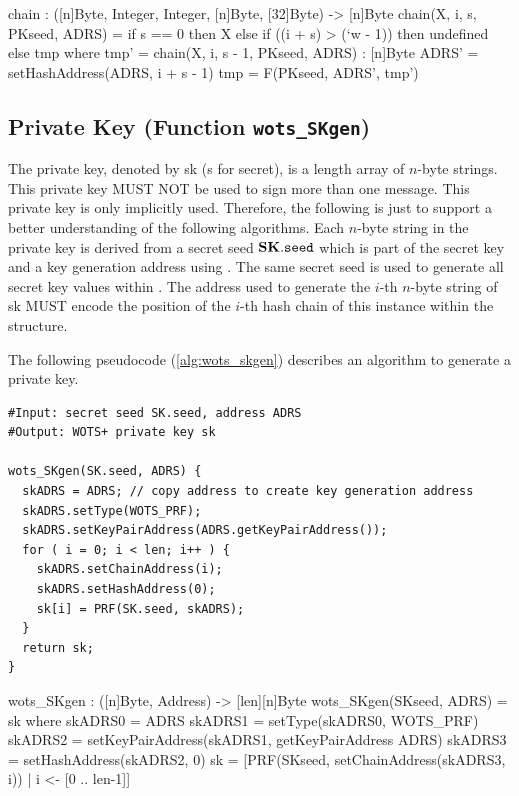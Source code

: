 \begin{code}
  chain : ([n]Byte, Integer, Integer, [n]Byte, [32]Byte) -> [n]Byte
  chain(X, i, s, PKseed, ADRS) =
    if s == 0 then
      X
    else if ((i + s) > (`w - 1)) then
      undefined
    else
      tmp
      where
        tmp' = chain(X, i, s - 1, PKseed, ADRS) : [n]Byte
        ADRS' = setHashAddress(ADRS, i + s - 1)
        tmp = F(PKseed, ADRS', tmp')
\end{code}

\subsection{\wotsp Private Key (Function \texttt{wots\_SKgen})}
The \wotsp private key, denoted by sk (s for secret), is a length \len array of
$n$-byte strings. This private key MUST NOT be used to sign more than one
message. This private key is only implicitly used. Therefore, the following is
just to support a better understanding of the following algorithms.
Each $n$-byte string in the \wotsp private key is derived from a secret
seed $\mathbf{SK}.\texttt{seed}$ which is part of the \spx secret key and
a \wotsp key generation address \skadrs using \sphincsPRF. The same secret seed is used to generate
all secret key values within \spx.
The address used to generate the $i$-th $n$-byte string of sk
MUST encode the position of the $i$-th hash chain of this \wotsp instance
within the \spx structure.

The following pseudocode (\autoref{alg:wots_skgen}) describes an algorithm
to generate a \wotsp private key.

\begin{lstlisting}[label=alg:wots_skgen, language=pseudoc,
                   caption=\texttt{wots\_SKgen} -- Generating a \wotsp private key.]
#Input: secret seed SK.seed, address ADRS
#Output: WOTS+ private key sk

wots_SKgen(SK.seed, ADRS) {
  skADRS = ADRS; // copy address to create key generation address
  skADRS.setType(WOTS_PRF);
  skADRS.setKeyPairAddress(ADRS.getKeyPairAddress());
  for ( i = 0; i < len; i++ ) {
    skADRS.setChainAddress(i);
    skADRS.setHashAddress(0);
    sk[i] = PRF(SK.seed, skADRS);
  }
  return sk;
}
\end{lstlisting}

\begin{code}
  wots_SKgen : ([n]Byte, Address) -> [len][n]Byte
  wots_SKgen(SKseed, ADRS) = sk where
    skADRS0 = ADRS
    skADRS1 = setType(skADRS0, WOTS_PRF)
    skADRS2 = setKeyPairAddress(skADRS1, getKeyPairAddress ADRS)
    skADRS3 = setHashAddress(skADRS2, 0)
    sk = [PRF(SKseed, setChainAddress(skADRS3, i)) | i <- [0 .. len-1]]
\end{code}

